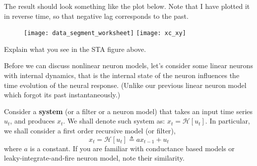 \documentclass[a4paper,11pt]{exam}
\newcommand{\system}[2]{\mathcal{#1}\left[ #2 \right]}
\begin{document}
\begin{questions}
The result should look something like the plot below.
Note that I have plotted it in reverse time, so that negative lag corresponds to the past.
\begin{figure}[htb]
    \centering
    \texttt{[image: data\_segment\_worksheet]}
    \texttt{[image: xc\_xy]}
\end{figure}
\question Explain what you see in the STA figure above.

\newpage
Before we can discuss nonlinear neuron models, let's consider some linear neurons with internal dynamics, that is the internal state of the neuron influences the time evolution of the neural response. (Unlike our previous linear neuron model which forgot its past instantaneously.)

\question Consider a \textbf{system} (or a filter or a neuron model) that takes an input time series $u_t$, and produces $x_t$. We shall denote such system as: $x_t = \system{H}{u_t}$. In particular, we shall consider a first order recursive model (or filter),
\begin{equation}\label{eq:filter:1}
    x_t = \system{H}{u_t} \triangleq a x_{t-1} + u_t
\end{equation}
where $a$ is a constant.
If you are familiar with conductance based models or leaky-integrate-and-fire neuron model, note their similarity.
\begin{parts}

\end{parts}
\end{questions}
\end{document}
